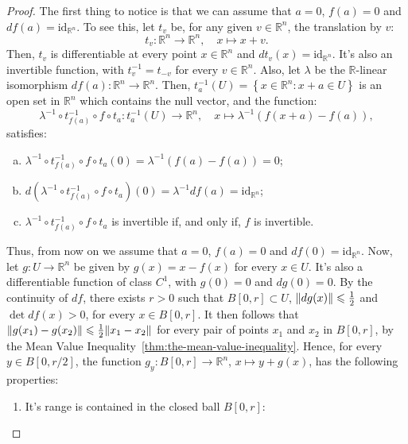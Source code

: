 \begin{proof}
	The first thing to notice is that we can assume that \({a=0}\), \(f(a)=0\) and
	\(df(a)=\text{id}_{\mathbb{R}^{n}}\). To see this, let \(t_{v}\) be, for any
	given \({v}\in{\mathbb{R}^{n}}\), the translation by \(v\):
	\[
		t_{v}:\mathbb{R}^{n}\to\mathbb{R}^{n},\quad{{x}\mapsto{x+v}}.
	\]
	Then, \(t_{v}\) is differentiable at every point \({x}\in{\mathbb{R}^{n}}\)
	and \(dt_{v}(x)=\text{id}_{\mathbb{R}^{n}}\). It's also an invertible
	function, with \(t_{v}^{-1}=t_{-v}\) for every \({v}\in{\mathbb{R}^{n}}\).
	Also, let \(\lambda\) be the \(\mathbb{R}\)-linear isomorphism
	\(df(a):\mathbb{R}^{n}\to\mathbb{R}^{n}\). Then,
	\(t_{a}^{-1}(U)=\left\{{x}\in{\mathbb{R}^{n}}:{x+a}\in{U}\right\}\) is an open
	set in \(\mathbb{R}^{n}\) which contains the null vector, and the function:
	\[
		\lambda^{-1}\circ{t_{f(a)}^{-1}}\circ{f}\circ{t_{a}}:t_{a}^{-1}(U)\to\mathbb{R}^{n},\quad{{x}\mapsto{\lambda^{-1}(f(x+a)-f(a))}},
	\]
	satisfies:
	\begin{enumerate}[a.]
		\item
		      \(\lambda^{-1}\circ{t_{f(a)}^{-1}}\circ{f}\circ{t_{a}}(0)=\lambda^{-1}\left(f(a)-f(a)\right)=0\);
		\item
		      \(d(\lambda^{-1}\circ{t_{f(a)}^{-1}}\circ{f}\circ{t_{a}})(0)=\lambda^{-1}df(a)=\text{id}_{\mathbb{R}^{n}}\);
		\item
		      \(\lambda^{-1}\circ{t_{f(a)}^{-1}}\circ{f}\circ{t_{a}}\) is
		      invertible if, and only if, \(f\) is invertible.
	\end{enumerate}
	Thus, from now on we assume that \(a=0\), \(f(a)=0\) and
	\(df(0)=\text{id}_{\mathbb{R}^{n}}\). Now, let \(g:{U}\to{\mathbb{R}^{n}}\) be
	given by \(g(x)=x-f(x)\) for every \({x}\in{U}\). It's also a differentiable
	function of class \(C^{1}\), with \(g(0)=0\) and \(dg(0)=0\). By the
	continuity of \(df\), there exists \(r>0\) such that \({B[0,r]}\subset{U}\),
	\(\lVert dg(x)\rVert\leqslant{\frac{1}{2}}\) and \(\det{df(x)}>0\), for every
	\({x}\in{B[0,r]}\). It then follows that
	\(\lVert g(x_{1})-g(x_{2})\rVert\leqslant{\frac{1}{2}\lVert x_{1}-x_{2}\rVert}\) for every
	pair of points \(x_{1}\) and \(x_{2}\) in \(B[0,r]\), by the Mean Value
	Inequality~\ref{thm:the-mean-value-inequality}. Hence, for every
	\({y}\in{B[0,r/2]}\), the function \(g_{y}:B[0,r]\to\mathbb{R}^{n}\),
	\({x}\mapsto{y+g(x)}\), has the following properties:
	\begin{enumerate}
		\item
		      It's range is contained in the closed ball \(B[0,r]\):
		      \[
\]
\end{enumerate}
\end{proof}
